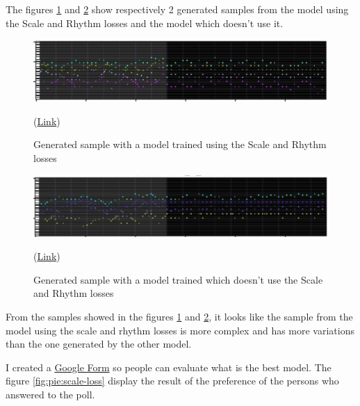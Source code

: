 \documentclass[12pt]{report}
\begin{document}
The figures \ref{fig:exp:scale-rhythm:with} and \ref{fig:exp:scale-rhythm:without} show respectively 2 generated samples from the model using the Scale and Rhythm losses and the model which doesn't use it.


\begin{figure}[htbp]
    \centering
    \includegraphics[width=\textwidth]{images/experiences/scale-rhythm-rnn/generated-with-scale-rhythm.jpg}
    \caption{Generated sample with a model trained using the Scale and Rhythm losses}
    (\href{https://github.com/ValentinVignal/midiGenerator/blob/master/samples/scale-rhythm-comparison/generated-with-scale-rhythm.mid}{Link})
    \label{fig:exp:scale-rhythm:with}
\end{figure}
\begin{figure}[htbp]
    \centering
    \includegraphics[width=\textwidth]{images/experiences/scale-rhythm-rnn/generated-without-scale-rhythm.jpg}
    \caption{Generated sample with a model trained which doesn't use the Scale and Rhythm losses}
    (\href{https://github.com/ValentinVignal/midiGenerator/blob/master/samples/scale-rhythm-comparison/generated-without-scale-rhythm.mid}{Link})
    \label{fig:exp:scale-rhythm:without}
\end{figure}

From the samples showed in the figures \ref{fig:exp:scale-rhythm:with} and \ref{fig:exp:scale-rhythm:without}, it looks like the sample from the model using the scale and rhythm losses is more complex and has more variations than the one generated by the other model.


I created a \href{https://docs.google.com/forms/d/e/1FAIpQLSckCvIg1mZdXlh1fSv_yG68dEbfQRN-WwkGG2KVdcjQ4rQgbw/viewform?usp=sf_link}{Google Form} so people can evaluate what is the best model.
The figure \ref{fig:pie:scale-loss} display the result of the preference of the persons who answered to the poll.
\end{document}
